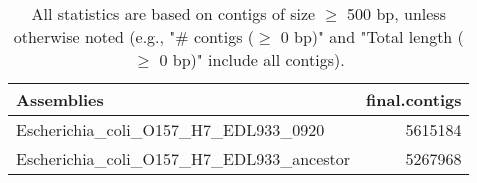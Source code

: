 \documentclass[12pt,a4paper]{article}
\begin{document}
\begin{table}[ht]
\begin{center}
\caption{All statistics are based on contigs of size $\geq$ 500 bp, unless otherwise noted (e.g., "\# contigs ($\geq$ 0 bp)" and "Total length ($\geq$ 0 bp)" include all contigs).}
\begin{tabular}{|l*{1}{|r}|}
\hline
Assemblies & final.contigs \\ \hline
Escherichia\_coli\_O157\_H7\_EDL933\_0920 & 5615184 \\ \hline
Escherichia\_coli\_O157\_H7\_EDL933\_ancestor & 5267968 \\ \hline
\end{tabular}
\end{center}
\end{table}
\end{document}
